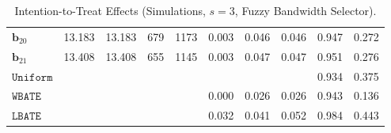 \documentclass[10pt]{article}
\newcommand{\bb}{\mathbf{b}}
\begin{document}
\begin{table}[p]
\begin{tabular}{lccccrrrrr}
$\bb_{20}$ & 13.183 & 13.183 & 679 & 1173 & 0.003 & 0.046 & 0.046 & 0.947 & 0.272 \\
$\bb_{21}$ & 13.408 & 13.408 & 655 & 1145 & 0.003 & 0.047 & 0.047 & 0.951 & 0.276 \\
\midrule
$\mathtt{Uniform}$ &  &  &  &  &  &  &  & 0.934 & 0.375 \\
\midrule
$\mathtt{WBATE}$ &  &  &  &  & 0.000 & 0.026 & 0.026 & 0.943 & 0.136 \\
\midrule
$\mathtt{LBATE}$ &  &  &  &  & 0.032 & 0.041 & 0.052 & 0.984 & 0.443 \\
\bottomrule\bottomrule
\end{tabular}

    \caption{Intention-to-Treat Effects (Simulations, $s=3$, Fuzzy Bandwidth Selector).}
    \label{tab:sa-simuls-itt-s3-bwmain}
\end{table}
\end{document}
